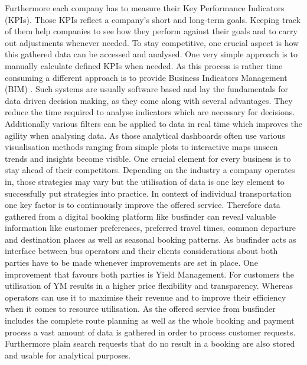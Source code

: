 Furthermore each company has to measure their Key Performance Indicators (KPIs). Those KPIs reflect a company's short and long-term goals. Keeping track of them help companies to see how they perform against their goals and to carry out adjustments whenever needed.\cite{kpi_imrpove_businiess} To stay competitive, one crucial aspect is how this gathered data can be accessed and analysed. One very simple approach is to manually calculate defined KPIs when needed. As this process is rather time consuming a different approach is to provide Business Indicators Management (BIM) \cite{kpi_imrpove_decision_making}. Such systems are usually software based and lay the fundamentals for data driven decision making, as they come along with several advantages. They reduce the time required to analyse indicators which are necessary for decisions. Additionally various filters can be applied to data in real time which improves the agility when analysing data. As those analytical dashboards often use various visualisation methods ranging from simple plots to interactive maps unseen trends and insights become visible.\cite{kpi_imrpove_decision_making}
\newline
\newline 
One crucial element for every business is to stay ahead of their competitors. Depending on the industry a company operates in, those strategies may vary but the utilisation of data is one key element to successfully put strategies into practice.
In context of individual transportation one key factor is to continuously improve the offered service.\cite{cont_imp} Therefore data gathered from a digital booking platform like busfinder can reveal valuable information like customer preferences, preferred travel times, common departure and destination places as well as seasonal booking patterns.
\newline
\newline
As busfinder acts as interface between bus operators and their clients considerations about both parties have to be made whenever improvements are set in place. One improvement that favours both parties is Yield Management. For customers the utilisation of YM results in a higher price flexibility and transparency. Whereas operators can use it to maximise their revenue and to improve their efficiency when it comes to resource utilisation.\cite{yield_m} As the offered service from busfinder includes the complete route planning as well as the whole booking and payment process a vast amount of data is gathered in order to process customer requests. Furthermore plain search requests that do no result in a booking are also stored and usable for analytical purposes.
